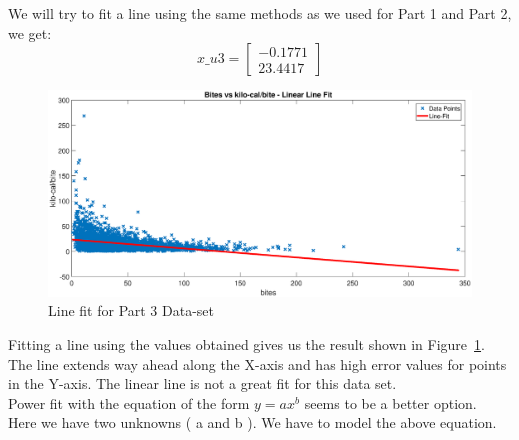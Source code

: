 \documentclass{article}
\begin{document}
\noindent
We will try to fit a line using the same methods as we used for Part 1 and Part 2, we get: \\
\[
x\_u3 =
\begin{bmatrix}
	-0.1771 \\
   	23.4417
\end{bmatrix}
\]
\newpage

\begin{figure}[h]
\centering
\includegraphics[width=\textwidth]{Part3_line.eps}
\caption{Line fit for Part 3 Data-set }
\label{fig:LineFit3}
\end{figure}

\noindent
Fitting a line using the values obtained gives us the result shown in Figure~\ref{fig:LineFit3}. The line extends way ahead along the X-axis and has high error values for points in the Y-axis. The linear line is not a great fit for this data set.  \\

\noindent
Power fit with the equation of the form $y = ax^b$ seems to be a better option.\\
Here we have two unknowns ( a and b ).  We have to model the above equation. 
\end{document}
